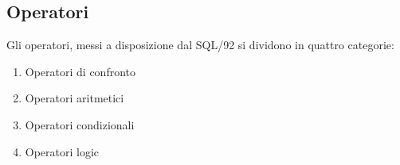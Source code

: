 \subsection{Operatori}
Gli operatori, messi a disposizione dal SQL/92 si dividono in quattro categorie:
\begin{enumerate}
\item Operatori di confronto
\item Operatori aritmetici
\item Operatori condizionali
\item Operatori logic
\end{enumerate}